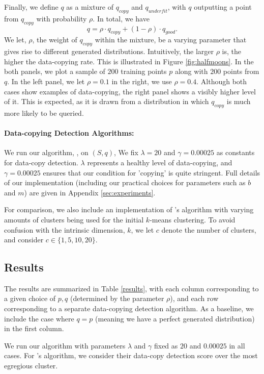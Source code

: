 Finally, we define $q$ as a mixture of $q_{copy}$ and $q_{underfit}$, with $q$ outputting a point from $q_{copy}$ with probability $\rho$. In total, we have $$q = \rho \cdot q_{copy} + (1-\rho) \cdot q_{good}.$$ We let, $\rho$, the weight of $q_{copy}$ within the mixture, be a varying parameter that gives rise to different generated distributions. Intuitively, the larger $\rho$ is, the higher the data-copying rate. This is illustrated in Figure \ref{fig:halfmoons}. In the both panels, we plot a sample of $200$ training points $p$ along with $200$ points from $q$. In the left panel, we let $\rho = 0.1$ in the right, we use $\rho = 0.4$. Although both cases show examples of data-copying, the right panel shows a visibly higher level of it. This is expected, as it is drawn from a distribution in which $q_{copy}$ is much more likely to be queried. 

\paragraph{Data-copying Detection Algorithms:} We run our algorithm, \dc{}, on $(S, q)$, We fix $\lambda = 20$ and $\gamma = 0.00025$ as constants for data-copy detection. $\lambda$ represents a healthy level of data-copying, and $\gamma = 0.00025$ ensures that our condition for 'copying' is quite stringent. Full details of our implementation (including our practical choices for parameters such as $b$ and $m$) are given in Appendix \ref{sec:experiments}.

For comparison, we also include an implementation of \cite{MCD2020}'s algorithm with varying amounts of clusters being used for the initial $k$-means clustering. To avoid confusion with the intrinsic dimension, $k$, we let $c$ denote the number of clusters, and consider $c \in \{1, 5, 10, 20\}$.

\subsection{Results}

The results are summarized in Table \ref{results}, with each column corresponding to a given choice of $p, q$ (determined by the parameter $\rho$), and each row corresponding to a separate data-copying detection algorithm. As a baseline, we include the case where $q = p$ (meaning we have a perfect generated distribution) in the first column.

We run our algorithm with parameters $\lambda$ and $\gamma$ fixed as $20$ and $0.00025$ in all cases. For \cite{MCD2020}'s algorithm, we consider their data-copy detection score over the most egregious cluster. 

